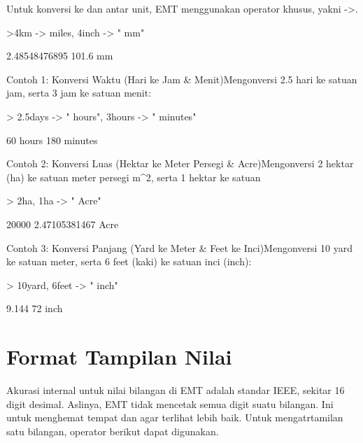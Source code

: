 \documentclass{article}
\newenvironment{eulernotebook}{\par}{\par}
\newcommand{\eulerheading}[1]{\section{#1}}
\newenvironment{eulercomment}{\par\medskip}{\par\medskip}
\begin{document}
\begin{eulernotebook}
\begin{eulercomment}
Untuk konversi ke dan antar unit, EMT menggunakan operator khusus,
yakni -\textgreater{}.
\end{eulercomment}
\begin{eulerprompt}
>4km -> miles, 4inch -> " mm"
\end{eulerprompt}
\begin{euleroutput}
  2.48548476895
  101.6 mm
\end{euleroutput}
\begin{eulercomment}
Contoh 1: Konversi Waktu (Hari ke Jam \& Menit)Mengonversi 2.5 hari ke
satuan jam, serta 3 jam ke satuan menit:
\end{eulercomment}
\begin{eulerprompt}
> 2.5days -> " hours", 3hours -> " minutes"
\end{eulerprompt}
\begin{euleroutput}
  60 hours
  180 minutes
\end{euleroutput}
\begin{eulercomment}
Contoh 2: Konversi Luas (Hektar ke Meter Persegi \& Acre)Mengonversi 2
hektar (ha) ke satuan meter persegi m\textasciicircum{}2, serta 1 hektar ke satuan 
\end{eulercomment}
\begin{eulerprompt}
> 2ha, 1ha -> " Acre"
\end{eulerprompt}
\begin{euleroutput}
  20000
  2.47105381467 Acre
\end{euleroutput}
\begin{eulercomment}
Contoh 3: Konversi Panjang (Yard ke Meter \& Feet ke Inci)Mengonversi
10 yard ke satuan meter, serta 6 feet (kaki) ke satuan inci (inch): 
\end{eulercomment}
\begin{eulerprompt}
> 10yard, 6feet -> " inch"
\end{eulerprompt}
\begin{euleroutput}
  9.144
  72 inch
\end{euleroutput}
\eulerheading{Format Tampilan Nilai}
\begin{eulercomment}
Akurasi internal untuk nilai bilangan di EMT adalah standar IEEE,
sekitar 16 digit desimal. Aslinya, EMT tidak mencetak semua digit
suatu bilangan. Ini untuk menghemat tempat dan agar terlihat lebih
baik. Untuk mengatrtamilan satu bilangan, operator berikut dapat
digunakan.


\end{eulercomment}
\end{eulernotebook}
\end{document}
